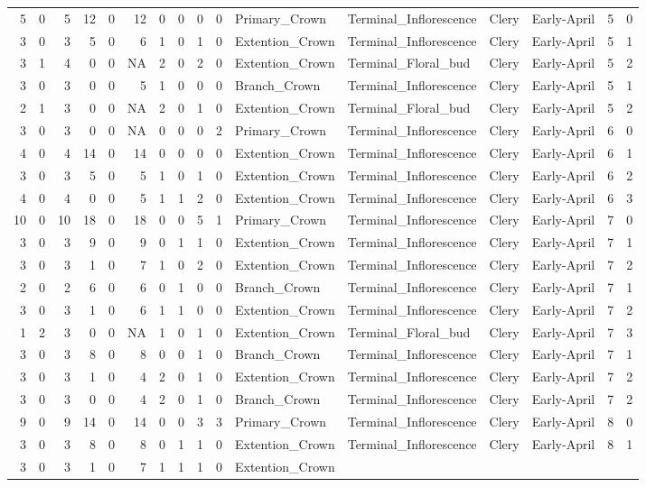 \documentclass[]{article}
\begin{document}
\begin{longtable}[]{@{}rrrrrrrrrrllllrl@{}}
5 & 0 & 5 & 12 & 0 & 12 & 0 & 0 & 0 & 0 & Primary\_Crown &
Terminal\_Inflorescence & Clery & Early-April & 5 & 0\tabularnewline
3 & 0 & 3 & 5 & 0 & 6 & 1 & 0 & 1 & 0 & Extention\_Crown &
Terminal\_Inflorescence & Clery & Early-April & 5 & 1\tabularnewline
3 & 1 & 4 & 0 & 0 & NA & 2 & 0 & 2 & 0 & Extention\_Crown &
Terminal\_Floral\_bud & Clery & Early-April & 5 & 2\tabularnewline
3 & 0 & 3 & 0 & 0 & 5 & 1 & 0 & 0 & 0 & Branch\_Crown &
Terminal\_Inflorescence & Clery & Early-April & 5 & 1\tabularnewline
2 & 1 & 3 & 0 & 0 & NA & 2 & 0 & 1 & 0 & Extention\_Crown &
Terminal\_Floral\_bud & Clery & Early-April & 5 & 2\tabularnewline
3 & 0 & 3 & 0 & 0 & NA & 0 & 0 & 0 & 2 & Primary\_Crown &
Terminal\_Inflorescence & Clery & Early-April & 6 & 0\tabularnewline
4 & 0 & 4 & 14 & 0 & 14 & 0 & 0 & 0 & 0 & Extention\_Crown &
Terminal\_Inflorescence & Clery & Early-April & 6 & 1\tabularnewline
3 & 0 & 3 & 5 & 0 & 5 & 1 & 0 & 1 & 0 & Extention\_Crown &
Terminal\_Inflorescence & Clery & Early-April & 6 & 2\tabularnewline
4 & 0 & 4 & 0 & 0 & 5 & 1 & 1 & 2 & 0 & Extention\_Crown &
Terminal\_Inflorescence & Clery & Early-April & 6 & 3\tabularnewline
10 & 0 & 10 & 18 & 0 & 18 & 0 & 0 & 5 & 1 & Primary\_Crown &
Terminal\_Inflorescence & Clery & Early-April & 7 & 0\tabularnewline
3 & 0 & 3 & 9 & 0 & 9 & 0 & 1 & 1 & 0 & Extention\_Crown &
Terminal\_Inflorescence & Clery & Early-April & 7 & 1\tabularnewline
3 & 0 & 3 & 1 & 0 & 7 & 1 & 0 & 2 & 0 & Extention\_Crown &
Terminal\_Inflorescence & Clery & Early-April & 7 & 2\tabularnewline
2 & 0 & 2 & 6 & 0 & 6 & 0 & 1 & 0 & 0 & Branch\_Crown &
Terminal\_Inflorescence & Clery & Early-April & 7 & 1\tabularnewline
3 & 0 & 3 & 1 & 0 & 6 & 1 & 1 & 0 & 0 & Extention\_Crown &
Terminal\_Inflorescence & Clery & Early-April & 7 & 2\tabularnewline
1 & 2 & 3 & 0 & 0 & NA & 1 & 0 & 1 & 0 & Extention\_Crown &
Terminal\_Floral\_bud & Clery & Early-April & 7 & 3\tabularnewline
3 & 0 & 3 & 8 & 0 & 8 & 0 & 0 & 1 & 0 & Branch\_Crown &
Terminal\_Inflorescence & Clery & Early-April & 7 & 1\tabularnewline
3 & 0 & 3 & 1 & 0 & 4 & 2 & 0 & 1 & 0 & Extention\_Crown &
Terminal\_Inflorescence & Clery & Early-April & 7 & 2\tabularnewline
3 & 0 & 3 & 0 & 0 & 4 & 2 & 0 & 1 & 0 & Branch\_Crown &
Terminal\_Inflorescence & Clery & Early-April & 7 & 2\tabularnewline
9 & 0 & 9 & 14 & 0 & 14 & 0 & 0 & 3 & 3 & Primary\_Crown &
Terminal\_Inflorescence & Clery & Early-April & 8 & 0\tabularnewline
3 & 0 & 3 & 8 & 0 & 8 & 0 & 1 & 1 & 0 & Extention\_Crown &
Terminal\_Inflorescence & Clery & Early-April & 8 & 1\tabularnewline
3 & 0 & 3 & 1 & 0 & 7 & 1 & 1 & 1 & 0 & Extention\_Crown &

\end{longtable}
\end{document}
